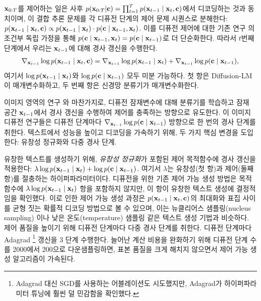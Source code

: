 $\mathbf{x}_{0:T}$를 제어하는 일은 사후 $p(\mathbf{x}_{0:T} | \mathbf{c}) = \prod_{t=1}^T p(\mathbf{x}_{t-1} \mid \mathbf{x}_{t}, \mathbf{c})$에서 디코딩하는 것과 동치이며, 이 결합 추론 문제를 각 디퓨전 단계의 제어 문제 시퀀스로 분해한다: $p(\mathbf{x}_{t-1} \mid \mathbf{x}_{t}, \mathbf{c}) \propto p(\mathbf{x}_{t-1} \mid \mathbf{x}_{t}) \cdot p(\mathbf{c} \mid \mathbf{x}_{t-1}, \mathbf{x}_{t})$.
이를 디퓨전 제어에 대한 기존 연구 \cite{song2021scorebased}의 조건부 독립 가정을 통해 $p(\mathbf{c} \mid \mathbf{x}_{t-1}, \mathbf{x}_{t})=p(\mathbf{c} \mid \mathbf{x}_{t-1})$로 더 단순화한다. 따라서 $t$번째 단계에서 우리는 $\mathbf{x}_{t-1}$에 대해 경사 갱신을 수행한다.
\begin{align*}
    \nabla_{\mathbf{x}_{t-1}} \log p(\mathbf{x}_{t-1} \mid \mathbf{x}_{t}, \mathbf{c}) = \nabla_{\mathbf{x}_{t-1}} \log p(\mathbf{x}_{t-1} \mid \mathbf{x}_{t}) + \nabla_{\mathbf{x}_{t-1}}  \log  p(\mathbf{c} \mid \mathbf{x}_{t-1}),
\end{align*}
여기서 $\log p(\mathbf{x}_{t-1} \mid \mathbf{x}_{t})$와 $\log p(\mathbf{c} \mid \mathbf{x}_{t-1})$ 모두 미분 가능하다. 첫 항은 Diffusion-LM이 매개변수화하고, 두 번째 항은 신경망 분류기가 매개변수화한다.


이미지 영역의 연구 \cite{dhariwal2021diffusion,song2021scorebased}와 마찬가지로, 디퓨전 잠재변수에 대해 분류기를 학습하고 잠재 공간 $\mathbf{x}_{t-1}$에서 경사 갱신을 수행하여 제어를 충족하는 방향으로 유도한다. 이 이미지 디퓨전 연구들은 디퓨전 단계마다 $\nabla_{ \mathbf{x}_{t-1}} \log  p(\mathbf{c} \mid \mathbf{x}_{t-1})$ 방향으로 한 번의 경사 단계를 취한다. 텍스트에서 성능을 높이고 디코딩을 가속하기 위해, 두 가지 핵심 변경을 도입한다: 유창성 정규화와 다중 경사 단계. 




유창한 텍스트를 생성하기 위해, \emph{유창성 정규화}가 포함된 제어 목적함수에 경사 갱신을 적용한다: $ \lambda \log p(\mathbf{x}_{t-1} \mid \mathbf{x}_{t}) + \log p(\mathbf{c} \mid \mathbf{x}_{t-1})$. 여기서 $\lambda$는 유창성(첫 항)과 제어(둘째 항)를 절충하는 하이퍼파라미터이다. 디퓨전을 위한 기존 제어 가능 생성 방법은 목적함수에 $\lambda \log p(\mathbf{x}_{t-1} \mid \mathbf{x}_{t})$ 항을 포함하지 않지만, 이 항이 유창한 텍스트 생성에 결정적임을 확인했다. 이로 인한 제어 가능 생성 과정은 $p(\mathbf{x}_{t-1} \mid \mathbf{x}_{t}, \mathbf{c})$의 최대화와 표집 사이를 균형 짓는 확률적 디코딩 방법으로 볼 수 있으며, 이는 뉴클리어스 샘플링(nucleus sampling) \cite{Holtzman2020Nucleus}이나 낮은 온도(temperature) 샘플링 같은 텍스트 생성 기법과 비슷하다. 제어 품질을 높이기 위해 디퓨전 단계마다 다중 경사 단계를 취한다. 디퓨전 단계마다 Adagrad \footnote{Adagrad 대신 SGD를 사용하는 어블레이션도 시도했지만, Adagrad가 하이퍼파라미터 튜닝에 훨씬 덜 민감함을 확인했다.} \cite{Duchi2010AdaptiveSM} 갱신을 3 단계 수행한다. 늘어난 계산 비용을 완화하기 위해 디퓨전 단계 수를 2000에서 200으로 다운샘플링하면, 표본 품질을 크게 해치지 않으면서 제어 가능 생성 알고리즘이 가속된다.


